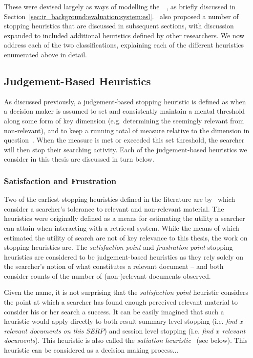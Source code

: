 These were devised largely as ways of modelling the~~\citep{cooper1968expected_search_length}, as briefly discussed in Section~\ref{sec:ir_background:evaluation:system:esl}.~\cite{nickles1995judgment} also proposed a number of stopping heuristics that are discussed in subsequent sections, with discussion expanded to included additional heuristics defined by other researchers. We now address each of the two classifications, explaining each of the different heuristics enumerated above in detail.

\subsection{Judgement-Based Heuristics}\label{sec:stopping_background:heuristics:judgement}
As discussed previously, a judgement-based stopping heuristic is defined as when a decision maker is assumed to set and consistently maintain a mental threshold along some form of key dimension (e.g. determining the seemingly relevant from non-relevant), and to keep a running total of measure relative to the dimension in question~\citep{gettys1979hypothesis, nickles1995judgment}. When the measure is met or exceeded this set threshold, the searcher will then stop their searching activity. Each of the judgement-based heuristics we consider in this thesis are discussed in turn below.

\subsubsection{Satisfaction and Frustration}\label{sec:stopping_background:heuristics:frustration}
Two of the earliest stopping heuristics defined in the literature are by~\cite{cooper1973retrieval_effectiveness_ii} which consider a searcher's tolerance to relevant and non-relevant material. The heuristics were originally defined as a means for estimating the utility a searcher can attain when interacting with a retrieval system. While the means of which~\cite{cooper1973retrieval_effectiveness_ii} estimated the utility of search are not of key relevance to this thesis, the work on stopping heuristics are. The \emph{satisfaction point} and \emph{frustration point} stopping heuristics are considered to be judgement-based heuristics as they rely solely on the searcher's notion of what constitutes a relevant document -- and both consider counts of the number of (non-)relevant documents observed.

Given the name, it is not surprising that the \emph{satisfaction point} heuristic considers the point at which a searcher has found enough perceived relevant material to consider his or her search a success. It can be easily imagined that such a heuristic would apply directly to both result summary level stopping (i.e. \emph{find $x$ relevant documents on this SERP}) and session level stopping (i.e. \emph{find $x$ relevant documents}). This heuristic is also called the \emph{satiation heuristic}~\citep{simon1955satiation} (see below). This heuristic can be considered as a decision making process...

